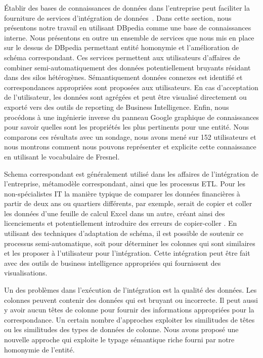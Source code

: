 \documentclass[a4paper,11pt,twoside]{ThesisStyle}
\begin{document}
Établir des bases de connaissances de données dans l'entreprise peut faciliter la fourniture de services d'intégration de données~\cite{Frischmuth:SemWebJorunal:12}. Dans cette section, nous présentons notre travail en utilisant DBpedia comme une base de connaissances interne. Nous présentons en outre un ensemble de services que nous mis en place sur le dessus de DBpedia permettant entité homonymie et l'amélioration de schéma correspondant. Ces services permettent aux utilisateurs d'affaires de combiner semi-automatiquement des données potentiellement bruyants résidant dans des silos hétérogènes. Sémantiquement données connexes est identifié et correspondances appropriées sont proposées aux utilisateurs. En cas d'acceptation de l'utilisateur, les données sont agrégées et peut être visualisé directement ou exporté vers des outils de reporting de Business Intelligence. Enfin, nous procédons à une ingénierie inverse du panneau Google graphique de connaissances pour savoir quelles sont les propriétés les plus pertinents pour une entité. Nous comparons ces résultats avec un sondage, nous avons mené sur 152 utilisateurs et nous montrons comment nous pouvons représenter et explicite cette connaissance en utilisant le vocabulaire de Fresnel.

Schema correspondant est généralement utilisé dans les affaires de l'intégration de l'entreprise, métamodèle correspondant, ainsi que les processus ETL. Pour les non-spécialistes IT la manière typique de comparer les données financières à partir de deux ans ou quartiers différents, par exemple, serait de copier et coller les données d'une feuille de calcul Excel dans un autre, créant ainsi des licenciements et potentiellement introduire des erreurs de copier-coller . En utilisant des techniques d'adaptation de schéma, il est possible de soutenir ce processus semi-automatique, soit pour déterminer les colonnes qui sont similaires et les proposer à l'utilisateur pour l'intégration. Cette intégration peut être fait avec des outils de business intelligence appropriées qui fournissent des visualisations.

Un des problèmes dans l'exécution de l'intégration est la qualité des données. Les colonnes peuvent contenir des données qui est bruyant ou incorrecte. Il peut aussi y avoir aucun têtes de colonne pour fournir des informations appropriées pour la correspondance. Un certain nombre d'approches exploiter les similitudes de têtes ou les similitudes des types de données de colonne. Nous avons proposé une nouvelle approche qui exploite le typage sémantique riche fourni par notre homonymie de l'entité.
\end{document}
